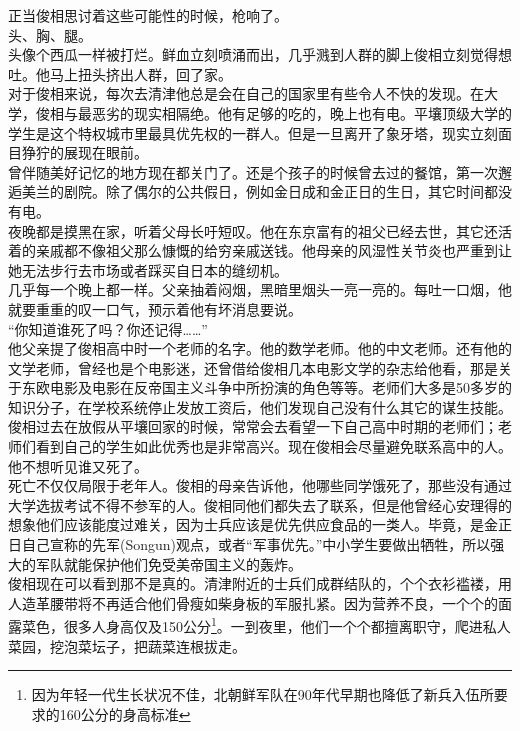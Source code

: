\begin{multicols}{\theparacolNo}
正当俊相思讨着这些可能性的时候，枪响了。\\

头、胸、腿。\\

头像个西瓜一样被打烂。鲜血立刻喷涌而出，几乎溅到人群的脚上俊相立刻觉得想吐。他马上扭头挤出人群，回了家。\\

对于俊相来说，每次去清津他总是会在自己的国家里有些令人不快的发现。在大学，俊相与最恶劣的现实相隔绝。他有足够的吃的，晚上也有电。平壤顶级大学的学生是这个特权城市里最具优先权的一群人。但是一旦离开了象牙塔，现实立刻面目狰狞的展现在眼前。\\

曾伴随美好记忆的地方现在都关门了。还是个孩子的时候曾去过的餐馆，第一次邂逅美兰的剧院。除了偶尔的公共假日，例如金日成和金正日的生日，其它时间都没有电。\\

夜晚都是摸黑在家，听着父母长吁短叹。他在东京富有的祖父已经去世，其它还活着的亲戚都不像祖父那么慷慨的给穷亲戚送钱。他母亲的风湿性关节炎也严重到让她无法步行去市场或者踩买自日本的缝纫机。\\

几乎每一个晚上都一样。父亲抽着闷烟，黑暗里烟头一亮一亮的。每吐一口烟，他就要重重的叹一口气，预示着他有坏消息要说。\\

“你知道谁死了吗？你还记得……”\\

他父亲提了俊相高中时一个老师的名字。他的数学老师。他的中文老师。还有他的文学老师，曾经也是个电影迷，还曾借给俊相几本电影文学的杂志给他看，那是关于东欧电影及电影在反帝国主义斗争中所扮演的角色等等。老师们大多是50多岁的知识分子，在学校系统停止发放工资后，他们发现自己没有什么其它的谋生技能。俊相过去在放假从平壤回家的时候，常常会去看望一下自己高中时期的老师们；老师们看到自己的学生如此优秀也是非常高兴。现在俊相会尽量避免联系高中的人。他不想听见谁又死了。\\

死亡不仅仅局限于老年人。俊相的母亲告诉他，他哪些同学饿死了，那些没有通过大学选拔考试不得不参军的人。俊相同他们都失去了联系，但是他曾经心安理得的想象他们应该能度过难关，因为士兵应该是优先供应食品的一类人。毕竟，是金正日自己宣称的先军(Songun)观点，或者“军事优先。”中小学生要做出牺牲，所以强大的军队就能保护他们免受美帝国主义的轰炸。\\

俊相现在可以看到那不是真的。清津附近的士兵们成群结队的，个个衣衫褴褛，用人造革腰带将不再适合他们骨瘦如柴身板的军服扎紧。因为营养不良，一个个的面露菜色，很多人身高仅及150公分\footnote{因为年轻一代生长状况不佳，北朝鲜军队在90年代早期也降低了新兵入伍所要求的160公分的身高标准}。一到夜里，他们一个个都擅离职守，爬进私人菜园，挖泡菜坛子，把蔬菜连根拔走。\\


\end{multicols}
